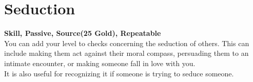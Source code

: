 \section{Seduction}\label{sec:seduction}
\textbf{Skill, Passive, Source(25 Gold), Repeatable}\\
You can add your level to checks concerning the seduction of others.
This can include making them act against their moral compass, persuading them to an intimate encounter, or making someone fall in love with you.\\
It is also useful for recognizing it if someone is trying to seduce someone.